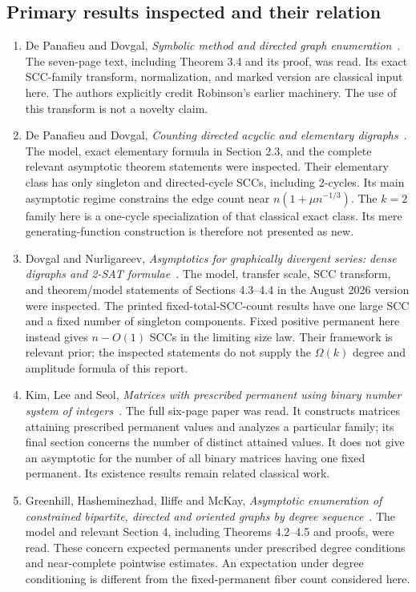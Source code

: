 \documentclass[11pt]{article}
\theoremstyle{definition}\newtheorem{definition}[theorem]{Definition}
\theoremstyle{remark}\newtheorem{remark}[theorem]{Remark}
\begin{document}
\subsection{Primary results inspected and their relation}
\begin{enumerate}
\item De Panafieu and Dovgal, \emph{Symbolic method and directed graph enumeration}~\cite{symbolic}. The seven-page text, including Theorem 3.4 and its proof, was read. Its exact SCC-family transform, normalization, and marked version are classical input here. The authors explicitly credit Robinson's earlier machinery. The use of this transform is not a novelty claim.
\item De Panafieu and Dovgal, \emph{Counting directed acyclic and elementary digraphs}~\cite{elementary}. The model, exact elementary formula in Section 2.3, and the complete relevant asymptotic theorem statements were inspected. Their elementary class has only singleton and directed-cycle SCCs, including 2-cycles. Its main asymptotic regime constrains the edge count near $n(1+\mu n^{-1/3})$. The $k=2$ family here is a one-cycle specialization of that classical exact class. Its mere generating-function construction is therefore not presented as new.
\item Dovgal and Nurligareev, \emph{Asymptotics for graphically divergent series: dense digraphs and 2-SAT formulae}~\cite{dense}. The model, transfer scale, SCC transform, and theorem/model statements of Sections 4.3--4.4 in the August 2026 version were inspected. The printed fixed-total-SCC-count results have one large SCC and a fixed number of singleton components. Fixed positive permanent here instead gives $n-O(1)$ SCCs in the limiting size law. Their framework is relevant prior; the inspected statements do not supply the $\Omega(k)$ degree and amplitude formula of this report.
\item Kim, Lee and Seol, \emph{Matrices with prescribed permanent using binary number system of integers}~\cite{prescribed}. The full six-page paper was read. It constructs matrices attaining prescribed permanent values and analyzes a particular family; its final section concerns the number of distinct attained values. It does not give an asymptotic for the number of all binary matrices having one fixed permanent. Its existence results remain related classical work.
\item Greenhill, Hasheminezhad, Iliffe and McKay, \emph{Asymptotic enumeration of constrained bipartite, directed and oriented graphs by degree sequence}~\cite{degrees}. The model and relevant Section 4, including Theorems 4.2--4.5 and proofs, were read. These concern expected permanents under prescribed degree conditions and near-complete pointwise estimates. An expectation under degree conditioning is different from the fixed-permanent fiber count considered here.
\end{enumerate}
\end{document}

